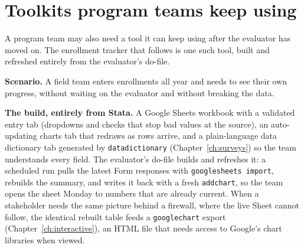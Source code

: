 \section{Toolkits program teams keep using}\label{sec:teamtoolkit}
A program team may also need a tool it can keep using after the evaluator has moved on. The enrollment tracker that follows is one such tool, built and refreshed entirely from the evaluator's do-file.

\begin{appliedexample}\label{ae:ch11-tracker}
\textbf{Scenario.} A field team enters enrollments all year and needs to see their own progress, without waiting on the evaluator and without breaking the data.

\medskip
\textbf{The build, entirely from Stata.} A Google Sheets workbook with a validated entry tab (dropdowns and checks that stop bad values at the source), an auto-updating charts tab that redraws as rows arrive, and a plain-language data dictionary tab generated by \texttt{datadictionary} (Chapter~\ref{ch:surveys}) so the team understands every field. The evaluator's do-file builds and refreshes it: a scheduled run pulls the latest Form responses with \texttt{googlesheets import}, rebuilds the summary, and writes it back with a fresh \texttt{addchart}, so the team opens the sheet Monday to numbers that are already current. When a stakeholder needs the same picture behind a firewall, where the live Sheet cannot follow, the identical rebuilt table feeds a \texttt{googlechart} export (Chapter~\ref{ch:interactive}), an HTML file that needs access to Google's chart libraries when viewed.


\end{appliedexample}
